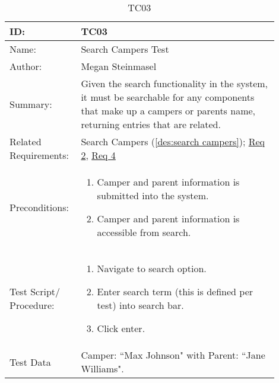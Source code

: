 \documentclass[11pt]{article}
\begin{document}
\begin{table}[H]
\begin{center}
\caption{TC03}
\label{TC03}
\begin{tabular}{p{0.20\linewidth}p{0.70\linewidth}}
	ID: & TC03\\\hline
	Name: & Search Campers Test \\\hline
	Author: & Megan Steinmasel\\\hline
	Summary: & Given the search functionality in the system, it must be searchable for any components that make up a campers or parents name, returning entries that are related. \\\hline
	Related \hspace{5em} Requirements:& Search Campers (\cref{des:search campers}); \hyperlink{Req2}{Req 2}, \hyperlink{Req4}{Req 4}\\\hline
	Preconditions:& \begin{enumerate}[topsep=0pt]
		\item Camper and parent information is submitted into the system.
		\item Camper and parent information is accessible from search.
	\end{enumerate}\\\hline
	Test Script/ Procedure: & \begin{enumerate}[topsep=0pt]
	\item Navigate to search option.
	\item Enter search term (this is defined per test) into search bar.
	\item Click enter.
	\end{enumerate}\\\hline
	Test Data & Camper: ``Max Johnson" with Parent: ``Jane Williams".
\end{tabular}
\end{center}
\end{table}
\end{document}
